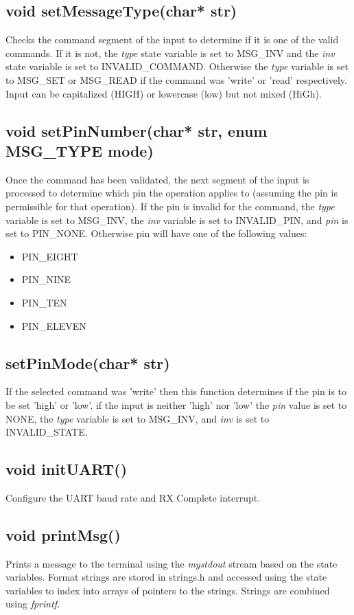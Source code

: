 \documentclass[letterpaper,11pt]{texMemo} %
\begin{document}
\subsection*{void setMessageType(char* str)}
Checks the command segment of the input to determine if it is one of the valid commands. If it is not, the \textit{type} state variable is set to MSG\_INV and the \textit{inv} state variable is set to INVALID\_COMMAND. Otherwise the \textit{type} variable is set to MSG\_SET or MSG\_READ if the command was 'write' or 'read' respectively. Input can be capitalized (HIGH) or lowercase (low) but not mixed (HiGh).
\subsection*{void setPinNumber(char* str, enum MSG\_TYPE mode)}
Once the command has been validated, the next segment of the input is processed to determine which pin the operation applies to (assuming the pin is permissible for that operation). If the pin is invalid for the command, the \textit{type} variable is set to MSG\_INV, the \textit{inv} variable is set to INVALID\_PIN, and \textit{pin} is set to PIN\_NONE. Otherwise pin will have one of the following values:
\begin{itemize}
\item PIN\_EIGHT\\
\item PIN\_NINE\\
\item PIN\_TEN\\
\item PIN\_ELEVEN
\end{itemize}
\subsection*{setPinMode(char* str)}
If the selected command was 'write' then this function determines if the pin is to be set 'high' or 'low'. if the input is neither 'high' nor 'low' the \textit{pin} value is set to NONE, the \textit{type} variable is set to MSG\_INV, and \textit{inv} is set to INVALID\_STATE.
\subsection*{void initUART()}
Configure the UART baud rate and RX Complete interrupt. 
\subsection*{void printMsg()}
Prints a message to the terminal using the \textit{mystdout} stream based on the state variables. Format strings are stored in strings.h and accessed using the state variables to index into arrays of pointers to the strings. Strings are combined using \textit{fprintf}.
\end{document}
